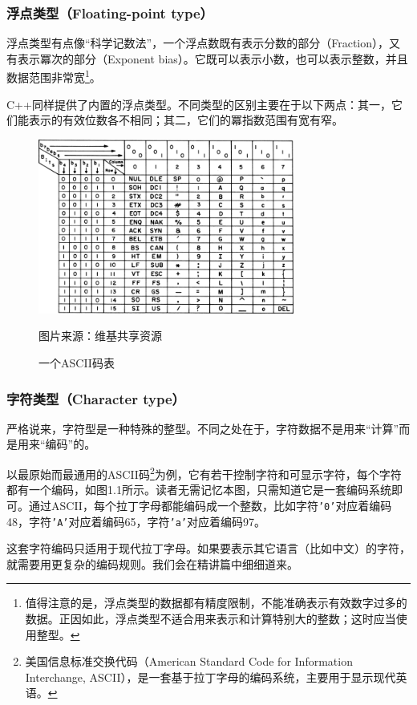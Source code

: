 \subsubsection*{浮点类型（Floating-point type）}
浮点类型有点像``科学记数法''，一个浮点数既有表示分数的部分（Fraction），又有表示冪次的部分（Exponent bias）。它既可以表示小数，也可以表示整数，并且数据范围非常宽\footnote{值得注意的是，浮点类型的数据都有精度限制，不能准确表示有效数字过多的数据。正因如此，浮点类型不适合用来表示和计算特别大的整数；这时应当使用整型。}。\par
C++同样提供了内置的浮点类型。不同类型的区别主要在于以下两点：其一，它们能表示的有效位数各不相同；其二，它们的冪指数范围有宽有窄。\par
\begin{figure}[htbp]
    \centering
    \includegraphics[width=0.75\textwidth]{../images/generalized_parts/01_ASCII.png}
    \caption{一个ASCII码表}
    \footnotesize{图片来源：维基共享资源}
\end{figure}
\subsubsection*{字符类型（Character type）}
严格说来，字符型是一种特殊的整型。不同之处在于，字符数据不是用来``计算''而是用来``编码''的。\par
以最原始而最通用的ASCII码\footnote{美国信息标准交换代码（American Standard Code for Information Interchange, ASCII），是一套基于拉丁字母的编码系统，主要用于显示现代英语。}为例，它有若干控制字符和可显示字符，每个字符都有一个编码，如图1.1所示。读者无需记忆本图，只需知道它是一套编码系统即可。通过ASCII，每个拉丁字母都能编码成一个整数，比如字符\texttt{'0'}对应着编码48，字符\texttt{'A'}对应着编码65，字符\texttt{'a'}对应着编码97。\par
这套字符编码只适用于现代拉丁字母。如果要表示其它语言（比如中文）的字符，就需要用更复杂的编码规则。我们会在精讲篇中细细道来。\par
